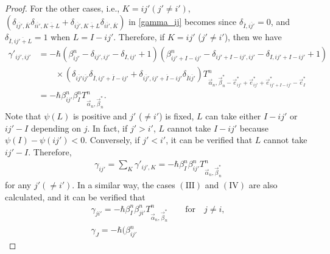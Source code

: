 \documentclass[10pt,a4paper]{amsart}
\numberwithin{equation}{section}
\begin{document}
\begin{proof}
For the other cases, i.e.,
$
 K
 =
 ij'
 (
 j'
 \neq
 i'
 )
$,
$
 (
 \delta_{
 \overline{ij'},
 \overline{K}
 }
 \delta_{
 \overline{ii'},
 \overline{K+L}
 }
 +
 \delta_{
 \overline{ij'},
 \overline{K+L}
 }
 \delta_{
 \overline{ii'},
 \overline{K}
 }
 )
$
in \eqref{gamma_ij} becomes
since
$
 \delta_{
 \overline{I},
 \overline{ij'}
 }
 =
 0
$,
and
$
 \delta_{
 \overline{I},
 \overline{ij'+L}
 }
 =
 1
$
when $L=I-ij'$. Therefore, if
$
 K
 =
 ij'$
 ($
 j'
 \neq
 i'
 $),
then we have
\begin{align*}
 \gamma'_{ij',ij'}
 &
 =
 -
 \hbar
 (
 \beta_{ij'}^{n}
 -
 \delta_{ij',ij'}
 -
 \delta_{I,ij'}
 +
 1
 )
 (
 \beta_{ij'+I-ij'}^{n}
 -
 \delta_{ij'+I-ij',ij'}
 -
 \delta_{I,ij'+I-ij'}
 +
 1
 )
 \nonumber
 \\
 &
 \qquad
 \times
 (
 \delta_{
 \overline{ij'}
 \overline{ij'}
 }
 \delta_{
 \overline{I},
 \overline{ij'+I-ij'}
 }
 +
 \delta_{
 \overline{ij'},
 \overline{ij'+I-ij'}
 }
 \delta_{
 \overline{I}
 \overline{ij'}
 }
 )
 T^{n}_{\vec{\alpha}_{n},\vec{\beta}_{n}^{\ast}-\vec{e}_{ij'}^{\ast}+\vec{e}_{ij'}^{\ast}+\vec{e}_{ij'+I-ij'}^{\ast}-\vec{e}_{I}^{\ast}}
 \\
 &=
 - \hbar
 \beta_{ij'}^{n}
 \beta_{I}^{n}
 T^{n}_{\vec{\alpha}_{n},\vec{\beta}_{n}^{\ast}}.
\end{align*}
Note that $\psi(L)$ is positive and
$
j'
$
($
\neq
i'
$)
is fixed, $L$ can take either $I-ij'$ or $ij'-I$ depending on $j$. In fact, if $j'>i'$, $L$ cannot take $I-ij'$ because $\psi(I)-\psi(ij')<0$. Conversely, if $j'<i'$, it can be verified that $L$ cannot take $ij'-I$. Therefore,
\begin{align}
 \gamma_{ij'}
 =
 \sum_{K}
 \gamma'_{ij',K}
 =
 -
 \hbar
 \beta_{I}^{n}
 \beta_{ij'}^{n}
 T^{n}_{\vec{\alpha}_{n},\vec{\beta}_{n}^{\ast}}
 \label{rec_rel_gene_3rdterm_2}
\end{align}
for
any
$
j'
(
\neq
i'
)
$. In a similar way, the cases $(\textrm{III})$ and $(\textrm{IV})$ are also calculated, and it can be verified that
\begin{gather}
 \gamma_{ji'}
 =
 -
 \hbar
 \beta_{I}^{n}
 \beta_{ji'}^{n}
 T^{n}_{\vec{\alpha}_{n},\vec{\beta}_{n}^{\ast}}
 \qquad
 \textrm{for}
\quad
 j
 \neq
 i
 ,
 \label{rec_rel_gene_3rdterm_3}
 \\
 \gamma_{J}
 =
 -
 \hbar
 (
 \beta_{ij'}^{n}

\end{gather}
\end{proof}
\end{document}
